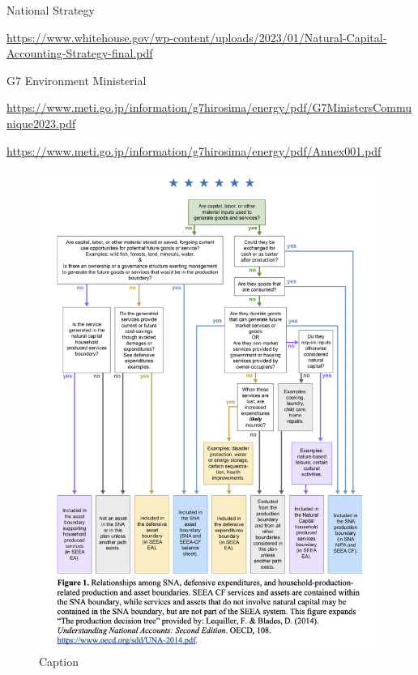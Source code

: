 \documentclass[12pt]{article}
\begin{document}
National Strategy 

\url{https://www.whitehouse.gov/wp-content/uploads/2023/01/Natural-Capital-Accounting-Strategy-final.pdf
}
 

G7 Environment Ministerial

 \url{https://www.meti.go.jp/information/g7hirosima/energy/pdf/G7MinistersCommunique2023.pdf}

\url{https://www.meti.go.jp/information/g7hirosima/energy/pdf/Annex001.pdf}

\begin{figure}[htp]
    \centering
    \includegraphics{Screen Shot 2023-04-17 at 10.15.08 AM.png}
    \caption{Caption}
    \label{fig:my_label}
\end{figure}
\end{document}

